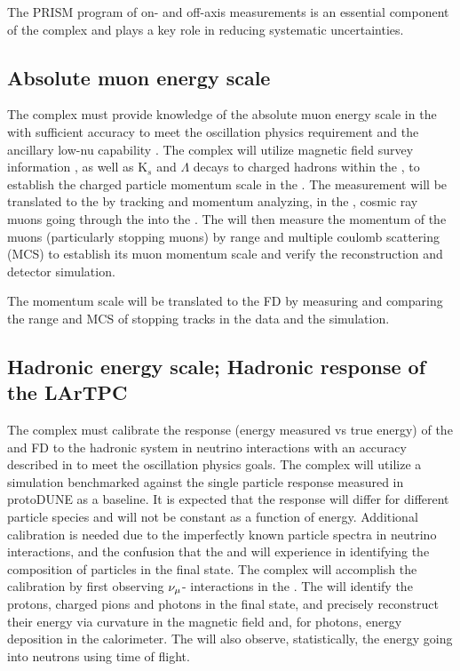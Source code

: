 The PRISM program of on- and off-axis measurements is an essential component of the   complex and plays a key role in reducing systematic uncertainties.


\subsection{Absolute muon energy scale}

The   complex must provide knowledge of the absolute muon energy scale in the \larnd with sufficient accuracy to meet the oscillation physics requirement  and the ancillary low-nu capability . The complex will utilize  magnetic field survey information , as well as K$_{s}$ and $\Lambda$ decays to charged hadrons  within the , to establish the charged particle momentum scale in the . 
The measurement will be translated to the \larnd by tracking and momentum analyzing, in the , cosmic ray muons going through the  into the \larnd {}. The \larnd will then measure the momentum of the muons (particularly stopping muons) by range and multiple coulomb scattering (MCS) to establish its muon momentum scale and verify the reconstruction and detector simulation. 

The momentum scale will be translated to the FD by measuring and comparing the range and MCS of stopping tracks in the data and the simulation.


\subsection{Hadronic energy scale; Hadronic response of the LArTPC}
The   complex must calibrate the response (energy measured vs true energy) of the \larnd and FD to the hadronic system in neutrino interactions with an accuracy described in  to meet the oscillation physics goals. The complex will utilize a simulation benchmarked against the single particle response measured in protoDUNE as a baseline. It is expected that the response will differ for different particle species and will not be constant as a function of energy. Additional calibration is needed due to the imperfectly known particle spectra in neutrino interactions, and the confusion that the    and  will experience in identifying the composition of particles in the final state. The   complex will accomplish the calibration by first observing $\nu_\mu$- interactions in the . The  will identify the protons, charged pions and photons in the final state, and precisely reconstruct their energy via curvature in the magnetic field and, for photons, energy deposition in the calorimeter. The  will also observe, statistically, the energy going into neutrons using time of flight.

